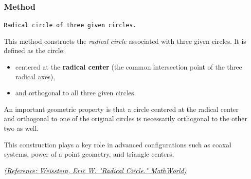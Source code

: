 \vspace{1em}
\begin{minipage}{.5\textwidth}
\begin{center}
\end{center}
\end{minipage}
\begin{minipage}{.5\textwidth}
\begin{tkzexample}
\end{tkzexample}
\end{minipage}

\subsubsection{Method }
\label{ssub:radical_circle}

\texttt{Radical circle of three given circles.}

\medskip

This method constructs the \emph{radical circle} associated with three given circles. It is defined as the circle:

\begin{itemize}
  \item centered at the \textbf{radical center} (the common intersection point of the three radical axes),
  \item and orthogonal to all three given circles.
\end{itemize}


An important geometric property is that a circle centered at the radical center and orthogonal to one of the original circles is necessarily orthogonal to the other two as well.

\medskip

This construction plays a key role in advanced configurations such as coaxal systems, power of a point geometry, and triangle centers.
\begin{flushright}
\small
\href{https://mathworld.wolfram.com/RadicalCircle.html}{\textit{(Reference: Weisstein, Eric W. "Radical Circle." MathWorld)}}
\end{flushright}


